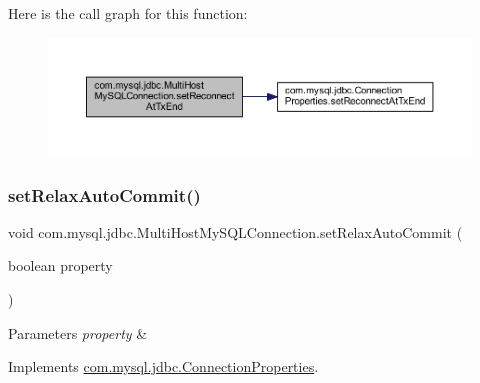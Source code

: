 Here is the call graph for this function\+:
\nopagebreak
\begin{figure}[H]
\begin{center}
\leavevmode
\includegraphics[width=350pt]{classcom_1_1mysql_1_1jdbc_1_1_multi_host_my_s_q_l_connection_aee7c83d3df1213baf1db90fa072c6262_cgraph}
\end{center}
\end{figure}
\mbox{\label{classcom_1_1mysql_1_1jdbc_1_1_multi_host_my_s_q_l_connection_adb974ee9a13de24aeadca3f29dc01549}} 
\subsubsection{\texorpdfstring{set\+Relax\+Auto\+Commit()}{setRelaxAutoCommit()}}
{\footnotesize\ttfamily void com.\+mysql.\+jdbc.\+Multi\+Host\+My\+S\+Q\+L\+Connection.\+set\+Relax\+Auto\+Commit (\begin{DoxyParamCaption}\item[{boolean}]{property }\end{DoxyParamCaption})}


\begin{DoxyParams}{Parameters}
{\em property} & \\
\hline
\end{DoxyParams}


Implements \mbox{\hyperlink{interfacecom_1_1mysql_1_1jdbc_1_1_connection_properties_a2b1a30e309c80866f41d0bc85d16e958}{com.\+mysql.\+jdbc.\+Connection\+Properties}}.

